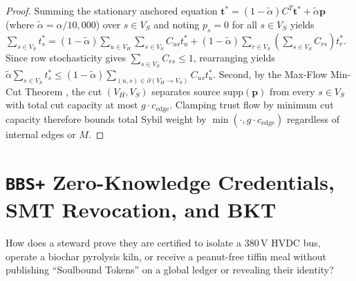 \begin{proof}
Summing the stationary anchored equation $\mathbf{t}^* = (1 - \tilde{\alpha}) C^T \mathbf{t}^* +
\tilde{\alpha} \mathbf{p}$ (where $\tilde{\alpha} = \alpha / 10{,}000$) over $s \in V_S$ and
noting $p_s = 0$ for all $s \in V_S$ yields
$\sum_{s \in V_S} t_s^* = (1 - \tilde{\alpha}) \sum_{u \in V_H} \sum_{s \in V_S} C_{us} t_u^* +
(1 - \tilde{\alpha}) \sum_{r \in V_S} (\sum_{s \in V_S} C_{rs}) t_r^*$. Since row stochasticity
gives $\sum_{s \in V_S} C_{rs} \le 1$, rearranging yields $\tilde{\alpha} \sum_{s \in V_S} t_s^*
\le (1 - \tilde{\alpha}) \sum_{(u,s) \in \partial(V_H \to V_S)} C_{us} t_u^*$. Second, by the
Max-Flow Min-Cut Theorem \parencite{ford1956maximal}, the cut $(V_H, V_S)$ separates source
$\mathrm{supp}(\mathbf{p})$ from every $s \in V_S$ with total cut capacity at most
$g \cdot c_{\mathrm{edge}}$. Clamping trust flow by minimum cut capacity therefore bounds total
Sybil weight by $\min(\cdot, g \cdot c_{\mathrm{edge}})$ regardless of internal edges or $M$.
\end{proof}

\section{\texttt{BBS+} Zero-Knowledge Credentials, SMT Revocation, and BKT}
\label{sec:ch3-bbs-plus-bkt}

How does a steward prove they are certified to isolate a $380\,\mathrm{V}$ HVDC bus, operate a
biochar pyrolysis kiln, or receive a peanut-free tiffin meal without publishing ``Soulbound
Tokens'' on a global ledger or revealing their identity?

